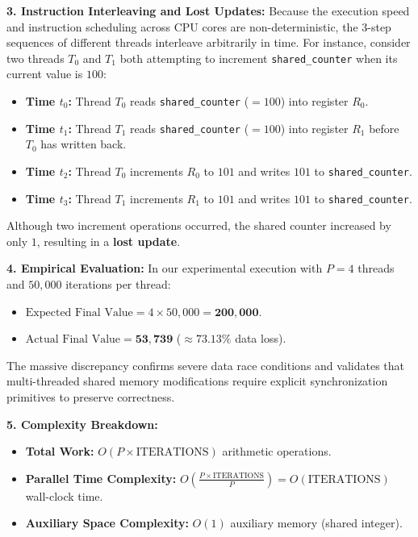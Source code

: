 \documentclass[12pt]{article}
\begin{document}
\textbf{3. Instruction Interleaving and Lost Updates:}
Because the execution speed and instruction scheduling across CPU cores are non-deterministic, the 3-step sequences of different threads interleave arbitrarily in time. For instance, consider two threads $T_0$ and $T_1$ both attempting to increment \texttt{shared\_counter} when its current value is $100$:
\begin{itemize}
    \item \textbf{Time $t_0$:} Thread $T_0$ reads \texttt{shared\_counter} ($= 100$) into register $R_0$.
    \item \textbf{Time $t_1$:} Thread $T_1$ reads \texttt{shared\_counter} ($= 100$) into register $R_1$ before $T_0$ has written back.
    \item \textbf{Time $t_2$:} Thread $T_0$ increments $R_0$ to $101$ and writes $101$ to \texttt{shared\_counter}.
    \item \textbf{Time $t_3$:} Thread $T_1$ increments $R_1$ to $101$ and writes $101$ to \texttt{shared\_counter}.
\end{itemize}
Although two increment operations occurred, the shared counter increased by only $1$, resulting in a \textbf{lost update}.

\textbf{4. Empirical Evaluation:}
In our experimental execution with $P = 4$ threads and $50,000$ iterations per thread:
\begin{itemize}
    \item $\text{Expected Final Value} = 4 \times 50,000 = \mathbf{200,000}$.
    \item $\text{Actual Final Value} = \mathbf{53,739}$ ($\approx 73.13\%$ data loss).
\end{itemize}
The massive discrepancy confirms severe data race conditions and validates that multi-threaded shared memory modifications require explicit synchronization primitives to preserve correctness.

\textbf{5. Complexity Breakdown:}
\begin{itemize}
    \item \textbf{Total Work:} $O(P \times \text{ITERATIONS})$ arithmetic operations.
    \item \textbf{Parallel Time Complexity:} $O\left(\frac{P \times \text{ITERATIONS}}{P}\right) = O(\text{ITERATIONS})$ wall-clock time.
    \item \textbf{Auxiliary Space Complexity:} $O(1)$ auxiliary memory (shared integer).
\end{itemize}

\newpage
\end{document}
